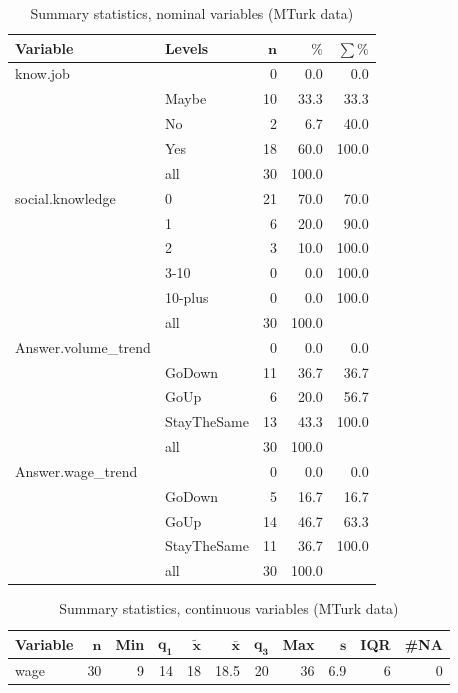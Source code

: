 \documentclass[a4paper,10pt]{article}\usepackage[]{graphicx}\usepackage[]{color}
\begin{document}
\begin{table}[ht]
\centering
{\footnotesize
\begin{tabular}{ll|rrr}
 \textbf{Variable} & \textbf{Levels} & $\mathbf{n}$ & $\mathbf{\%}$ & $\mathbf{\sum \%}$ \\ 
  \hline
know.job &  & 0 & 0.0 & 0.0 \\ 
   & Maybe & 10 & 33.3 & 33.3 \\ 
   & No & 2 & 6.7 & 40.0 \\ 
   & Yes & 18 & 60.0 & 100.0 \\ 
   \hline
 & all & 30 & 100.0 &  \\ 
   \hline
\hline
social.knowledge & 0 & 21 & 70.0 & 70.0 \\ 
   & 1 & 6 & 20.0 & 90.0 \\ 
   & 2 & 3 & 10.0 & 100.0 \\ 
   & 3-10 & 0 & 0.0 & 100.0 \\ 
   & 10-plus & 0 & 0.0 & 100.0 \\ 
   \hline
 & all & 30 & 100.0 &  \\ 
   \hline
\hline
Answer.volume\_trend &  & 0 & 0.0 & 0.0 \\ 
   & GoDown & 11 & 36.7 & 36.7 \\ 
   & GoUp & 6 & 20.0 & 56.7 \\ 
   & StayTheSame & 13 & 43.3 & 100.0 \\ 
   \hline
 & all & 30 & 100.0 &  \\ 
   \hline
\hline
Answer.wage\_trend &  & 0 & 0.0 & 0.0 \\ 
   & GoDown & 5 & 16.7 & 16.7 \\ 
   & GoUp & 14 & 46.7 & 63.3 \\ 
   & StayTheSame & 11 & 36.7 & 100.0 \\ 
   \hline
 & all & 30 & 100.0 &  \\ 
   \hline
\hline
\end{tabular}
}
\caption{Summary statistics, nominal variables (MTurk data)} 
\label{tab1:53-7050}
\end{table}
\begin{table}[ht]
\centering
{\footnotesize
\begin{tabular}{lrrrrrrrrrr}
 \textbf{Variable} & $\mathbf{n}$ & \textbf{Min} & $\mathbf{q_1}$ & $\mathbf{\widetilde{x}}$ & $\mathbf{\bar{x}}$ & $\mathbf{q_3}$ & \textbf{Max} & $\mathbf{s}$ & \textbf{IQR} & \textbf{\#NA} \\ 
  \hline
wage & 30 & 9 & 14 & 18 & 18.5 & 20 & 36 & 6.9 & 6 & 0 \\ 
  \end{tabular}
}
\caption{Summary statistics, continuous variables (MTurk data)} 
\label{tab2:53-7050}
\end{table}
\end{document}
